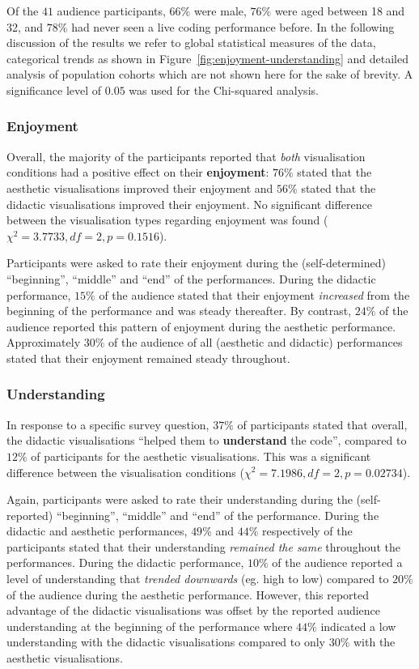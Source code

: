 \documentclass{sig-alternate}
\begin{document}
Of the $41$ audience participants, $66\%$ were male, $76\%$ were aged
between 18 and 32, and $78\%$ had never seen a live coding performance
before. In the following discussion of the results we refer to global
statistical measures of the data, categorical trends as shown in
Figure~\ref{fig:enjoyment-understanding} and detailed analysis of
population cohorts which are not shown here for the sake of brevity. A
significance level of $0.05$ was used for the Chi-squared analysis.

\subsubsection{Enjoyment}

Overall, the majority of the participants reported that \emph{both}
visualisation conditions had a positive effect on their
\textbf{enjoyment}: $76\%$ stated that the aesthetic visualisations
improved their enjoyment and $56\%$ stated that the didactic
visualisations improved their enjoyment. No significant difference
between the visualisation types regarding enjoyment was found
($\chi^2=3.7733,df=2,p=0.1516$).

Participants were asked to rate their enjoyment during the
(self-determined) ``beginning'', ``middle'' and ``end'' of the
performances. During the didactic performance, $15\%$ of the audience
stated that their enjoyment \emph{increased} from the beginning of the
performance and was steady thereafter. By contrast, $24\%$ of the
audience reported this pattern of enjoyment during the aesthetic
performance. Approximately $30\%$ of the audience of all (aesthetic
and didactic) performances stated that their enjoyment remained steady
throughout.

\subsubsection{Understanding}

In response to a specific survey question, $37\%$ of participants
stated that overall, the didactic visualisations ``helped them to
\textbf{understand} the code'', compared to $12\%$ of participants for
the aesthetic visualisations. This was a significant difference
between the visualisation conditions ($\chi^2=7.1986,df=2,p=0.02734$).

Again, participants were asked to rate their understanding during the
(self-reported) ``beginning'', ``middle'' and ``end'' of the
performance. During the didactic and aesthetic performances, $49\%$
and $44\%$ respectively of the participants stated that their
understanding \emph{remained the same} throughout the performances.
During the didactic performance, $10\%$ of the audience reported a
level of understanding that \emph{trended downwards} (eg. high to low)
compared to $20\%$ of the audience during the aesthetic performance.
However, this reported advantage of the didactic visualisations was
offset by the reported audience understanding at the beginning of the
performance where $44\%$ indicated a low understanding with the
didactic visualisations compared to only $30\%$ with the aesthetic
visualisations.
\end{document}
